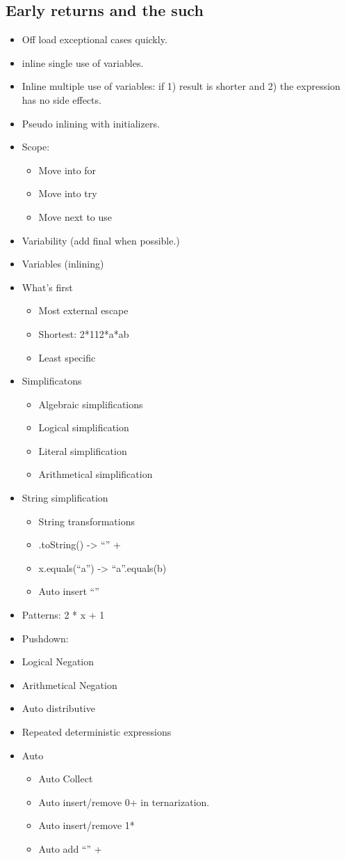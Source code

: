 \subsection{Early returns and the such}
\begin{itemize}
\item Off load exceptional cases quickly.
\item inline single use of variables.
\item Inline multiple use of variables: if 1) result is shorter and 2) the expression has no side effects.
\item Pseudo inlining with initializers.
\item Scope:
\begin{itemize}
 \item Move into for
 \item Move into try
 \item Move next to use
\end{itemize}
\item Variability (add final when possible.)
\item Variables (inlining)
\item What’s first
\begin{itemize}
 \item Most external escape
 \item Shortest: 2*112*a*ab
 \item Least specific
\end{itemize}
\item Simplificatons
\begin{itemize}
 \item Algebraic simplifications
 \item Logical simplification
 \item Literal simplification
 \item Arithmetical simplification
\end{itemize}
\item String simplification
\begin{itemize}
 \item String transformations
 \item .toString() -> “” +
 \item x.equals(“a”) -> “a”.equals(b)
 \item Auto insert “”
\end{itemize}
\item Patterns: 2 * x + 1
\item Pushdown:
\item Logical Negation
\item Arithmetical Negation
\item Auto distributive
\item Repeated deterministic expressions
\item Auto
\begin{itemize}
 \item Auto Collect
 \item Auto insert/remove 0+ in ternarization.
 \item Auto insert/remove 1*
 \item Auto add “” +
\end{itemize}


\end{itemize}
